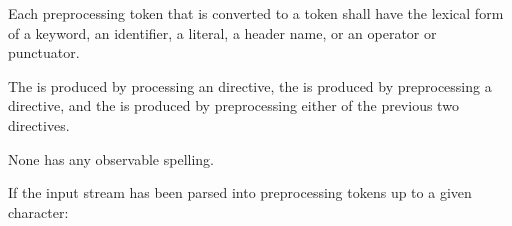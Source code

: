 \pnum
Each preprocessing token that is converted to a token
shall have the lexical form of a keyword, an identifier, a literal,
a header name,
or an operator or punctuator.

\pnum
{}%
%
%
The  is produced
by processing an  directive,
the  is produced
by preprocessing a  directive, and
the  is produced
by preprocessing either of the previous two directives.
\begin{note}
None has any observable spelling.
\end{note}

\pnum
If the input stream has been parsed into preprocessing tokens up to a
given character:
